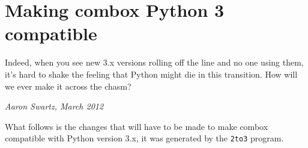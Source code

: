 \chapter{Making combox Python 3 compatible}\label{a-python3c}

\epigraph{Indeed, when you see new 3.x versions rolling off the line
  and no one using them, it’s hard to shake the feeling that Python
  might die in this transition. How will we ever make it across the
  chasm?}{\textit{Aaron Swartz, March 2012}}

What follows is the changes that will have to be made to make combox
compatible with Python version 3.x, it was generated by the
\verb+2to3+ program.

